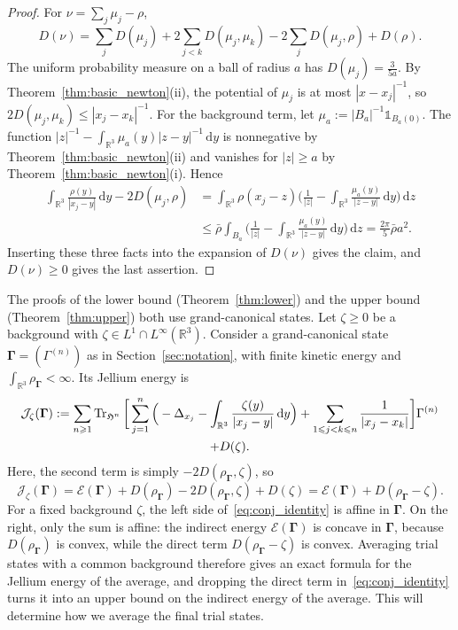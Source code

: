 \documentclass[final,reqno]{amsart}
\theoremstyle{remark}
\theoremstyle{definition}
\renewcommand{\le}{\leqslant}
\renewcommand{\ge}{\geqslant}
\newcommand{\RR}{\mathbb{R}}
\newcommand{\iden}{\mathbb{1}}
\newcommand{\EC}{\mathcal{E}}
\newcommand{\Hil}{\mathfrak{H}}
\newcommand{\vGamma}{{\bm{\Gamma}}}
\begin{document}
\begin{proof}
For $\nu=\sum_j\mu_j-\rho$,
\[
D(\nu)=\sum_jD(\mu_j)+2\sum_{j<k}D(\mu_j,\mu_k)-2\sum_jD(\mu_j,\rho)+D(\rho).
\]
The uniform probability measure on a ball of radius $a$ has $D(\mu_j)=\frac3{5a}$. By Theorem~\ref{thm:basic_newton}(ii), the potential of $\mu_j$ is at most $|x-x_j|^{-1}$, so $2D(\mu_j,\mu_k)\le|x_j-x_k|^{-1}$. For the background term, let $\mu_a:=|B_a|^{-1}\iden_{B_a(0)}$. The function $|z|^{-1}-\int_{\RR^3}\mu_a(y)|z-y|^{-1}\,\mathrm dy$ is nonnegative by Theorem~\ref{thm:basic_newton}(ii) and vanishes for $|z|\ge a$ by Theorem~\ref{thm:basic_newton}(i). Hence
\begin{align*}
\int_{\RR^3}\frac{\rho(y)}{|x_j-y|}\,\mathrm dy-2D(\mu_j,\rho)
&=\int_{\RR^3}\rho(x_j-z)\Big(\frac1{|z|}-\int_{\RR^3}\frac{\mu_a(y)}{|z-y|}\,\mathrm dy\Big)\,\mathrm dz\\
&\le\bar\rho\int_{B_a}\Big(\frac1{|z|}-\int_{\RR^3}\frac{\mu_a(y)}{|z-y|}\,\mathrm dy\Big)\,\mathrm dz
=\frac{2\pi}5\bar\rho a^2.
\end{align*}
Inserting these three facts into the expansion of $D(\nu)$ gives the claim, and $D(\nu)\ge0$ gives the last assertion.
\end{proof}

The proofs of the lower bound (Theorem~\ref{thm:lower}) and the upper bound (Theorem~\ref{thm:upper}) both use grand-canonical states. Let $\zeta\ge0$ be a background with $\zeta\in L^1\cap L^\infty(\RR^3)$. Consider a grand-canonical state $\vGamma=(\Gamma^{(n)})$ as in Section~\ref{sec:notation}, with finite kinetic energy and $\int_{\RR^3}\rho_{\vGamma}<\infty$. Its Jellium energy is
\begin{multline*}
\mathcal{J}_\zeta(\vGamma):=\sum_{n\ge1}\Tr_{\Hil^n}\bigg[\sum_{j=1}^n\Big(-\Delta_{x_j}-\int_{\RR^3}\frac{\zeta(y)}{|x_j-y|}\,\mathrm dy\Big)+\sum_{1\le j<k\le n}\frac{1}{|x_j-x_k|}\bigg]\Gamma^{(n)}\\
+D(\zeta).
\end{multline*}
Here, the second term is simply $-2D(\rho_{\vGamma},\zeta)$, so
\begin{equation}\label{eq:conj_identity}
\mathcal{J}_\zeta(\vGamma)=\EC(\vGamma)+D(\rho_{\vGamma})-2D(\rho_{\vGamma},\zeta)+D(\zeta)=\EC(\vGamma)+D(\rho_{\vGamma}-\zeta).
\end{equation}
For a fixed background $\zeta$, the left side of~\eqref{eq:conj_identity} is affine in $\vGamma$. On the right, only the sum is affine: the indirect energy $\EC(\vGamma)$ is concave in $\vGamma$, because $D(\rho_{\vGamma})$ is convex, while the direct term $D(\rho_{\vGamma}-\zeta)$ is convex. Averaging trial states with a common background therefore gives an exact formula for the Jellium energy of the average, and dropping the direct term in~\eqref{eq:conj_identity} turns it into an upper bound on the indirect energy of the average. This will determine how we average the final trial states.
\end{document}

